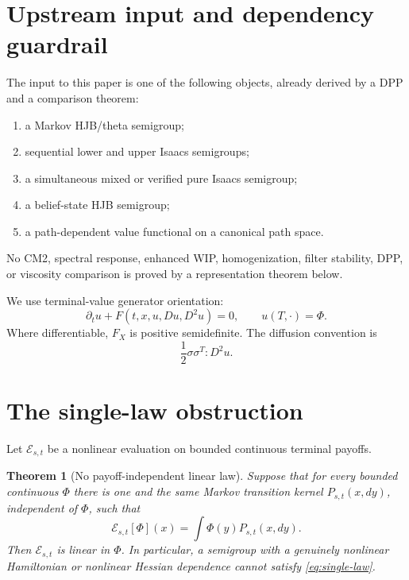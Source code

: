 \documentclass[11pt,reqno]{amsart}
\newtheorem{theorem}{Theorem}[section]
\theoremstyle{definition}
\theoremstyle{remark}
\newcommand{\cE}{\mathcal E}
\begin{document}
\section{Upstream input and dependency guardrail}\label{sec:input}

The input to this paper is one of the following objects, already derived by a
DPP and a comparison theorem:
\begin{enumerate}[label=\textup{(\roman*)}]
\item a Markov HJB/theta semigroup;
\item sequential lower and upper Isaacs semigroups;
\item a simultaneous mixed or verified pure Isaacs semigroup;
\item a belief-state HJB semigroup;
\item a path-dependent value functional on a canonical path space.
\end{enumerate}
No CM2, spectral response, enhanced WIP, homogenization, filter stability, DPP,
or viscosity comparison is proved by a representation theorem below.

We use terminal-value generator orientation:
\begin{equation}\label{eq:orientation}
 \partial_tu+F(t,x,u,Du,D^2u)=0,
 \qquad u(T,\cdot)=\Phi.
\end{equation}
Where differentiable, $F_X$ is positive semidefinite.  The diffusion convention
is
\[
 \frac12\sigma\sigma^T:D^2u.
\]

\section{The single-law obstruction}\label{sec:nogo}

Let $\cE_{s,t}$ be a nonlinear evaluation on bounded continuous terminal
payoffs.

\begin{theorem}[No payoff-independent linear law]\label{thm:single-law}
Suppose that for every bounded continuous $\Phi$ there is one and the same
Markov transition kernel $P_{s,t}(x,dy)$, independent of $\Phi$, such that
\begin{equation}\label{eq:single-law}
 \cE_{s,t}[\Phi](x)=\int\Phi(y)P_{s,t}(x,dy).
\end{equation}
Then $\cE_{s,t}$ is linear in $\Phi$.  In particular, a semigroup with a
genuinely nonlinear Hamiltonian or nonlinear Hessian dependence cannot satisfy
\eqref{eq:single-law}.
\end{theorem}
\end{document}
